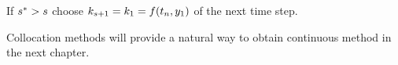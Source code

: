 \begin{remark}
  If $s^* > s$ choose $k_{s+1} = k_1 = f(t_n,y_1)$ of the next time step.
\end{remark}




\begin{remark}
  Collocation methods will provide a natural way to obtain continuous
  method in the next chapter.
\end{remark}

